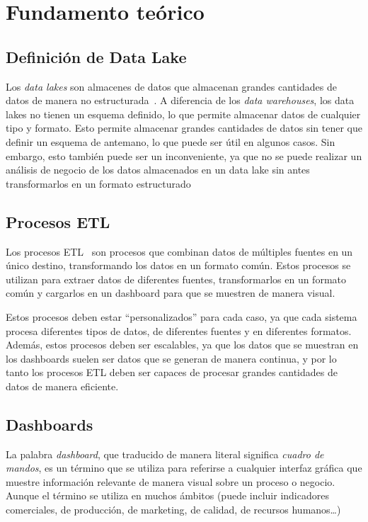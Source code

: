 \chapter{Fundamento teórico}\label{chap:teoria}
\section{Definición de Data Lake}\label{sec:datalake}
Los \textit{data lakes} son almacenes de datos que almacenan grandes cantidades de
datos de manera no estructurada~\cite{mier2023dashboards}. A diferencia de los
\textit{data warehouses}, los data lakes no tienen un esquema definido, lo que permite
almacenar datos de cualquier tipo y formato. Esto permite almacenar grandes
cantidades de datos sin tener que definir un esquema de antemano, lo que puede
ser útil en algunos casos. Sin embargo, esto también puede ser un inconveniente, ya
que no se puede realizar un análisis de negocio de los datos almacenados en un
data lake sin antes transformarlos en un formato estructurado

\section{Procesos ETL}\label{sec:etl}
Los procesos ETL~\cite{mier2023dashboards} son procesos que combinan datos de múltiples
fuentes en un único destino, transformando los datos en un formato común. Estos procesos
se utilizan para extraer datos de diferentes fuentes, transformarlos en un formato común
y cargarlos en un dashboard para que se muestren de manera visual.

Estos procesos deben estar “personalizados” para cada caso, ya que cada sistema
procesa diferentes tipos de datos, de diferentes fuentes y en diferentes formatos. Además,
estos procesos deben ser escalables, ya que los datos que se muestran en los dashboards
suelen ser datos que se generan de manera continua, y por lo tanto los procesos ETL deben
ser capaces de procesar grandes cantidades de datos de manera eficiente.

\section{Dashboards}\label{sec:dashboards}
La palabra \textit{dashboard}, que traducido de manera literal significa \textit{cuadro de mandos},
es un término que se utiliza para referirse a cualquier interfaz gráfica que muestre información
relevante de manera visual sobre un proceso o negocio. Aunque el término se utiliza en
muchos ámbitos (puede incluir indicadores comerciales, de producción, de marketing, de
calidad, de recursos humanos\ldots)

